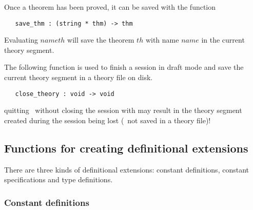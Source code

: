 Once a theorem has been proved, it can be saved with the function

\begin{boxed}
\begin{verbatim}
   save_thm : (string * thm) -> thm
\end{verbatim}\end{boxed}

\noindent
Evaluating $name$$th$\ml{)} will save the theorem
$th$ with name $name$ in the current theory segment.

The following function is used to finish a session in  draft mode  and save the
current theory segment in a theory file on disk.

\begin{boxed}
\begin{verbatim}
   close_theory : void -> void
\end{verbatim}\end{boxed}

 quitting \HOL\ without closing the session with
 may result in the theory segment created during the session
being lost (\ie\ not saved in a theory file)!

\subsection{Functions for creating definitional extensions}
\label{avra_definitional}

There are three kinds of definitional extensions:
constant definitions, constant specifications and type definitions.

\subsubsection{Constant definitions}


